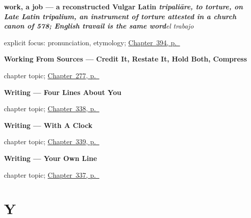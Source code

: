 \noindent\begin{minipage}[t]{\linewidth}
\raggedright
\textbf{work, a job — a reconstructed Vulgar Latin \emph{tripaliāre, to torture, on Late Latin tripalium, an instrument of torture attested in a church canon of 578; English travail is the same word}}\enspace\emph{el trabajo}\par
\footnotesize explicit focus: pronunciation, etymology; \hyperref[ch:la-universidad-y-el-trabajo]{Chapter~394, p.~\pageref*{ch:la-universidad-y-el-trabajo}}
\end{minipage}\par\smallskip

\noindent\begin{minipage}[t]{\linewidth}
\raggedright
\textbf{Working From Sources --- Credit It, Restate It, Hold Both, Compress}\par
\footnotesize chapter topic; \hyperref[ch:fuentes]{Chapter~277, p.~\pageref*{ch:fuentes}}
\end{minipage}\par\smallskip

\noindent\begin{minipage}[t]{\linewidth}
\raggedright
\textbf{Writing --- Four Lines About You}\par
\footnotesize chapter topic; \hyperref[ch:escribir-ficha-personal]{Chapter~338, p.~\pageref*{ch:escribir-ficha-personal}}
\end{minipage}\par\smallskip

\noindent\begin{minipage}[t]{\linewidth}
\raggedright
\textbf{Writing --- With A Clock}\par
\footnotesize chapter topic; \hyperref[ch:escribir-con-reloj]{Chapter~339, p.~\pageref*{ch:escribir-con-reloj}}
\end{minipage}\par\smallskip

\noindent\begin{minipage}[t]{\linewidth}
\raggedright
\textbf{Writing --- Your Own Line}\par
\footnotesize chapter topic; \hyperref[ch:escribir-frase-propia]{Chapter~337, p.~\pageref*{ch:escribir-frase-propia}}
\end{minipage}\par\smallskip

\section*{Y}

